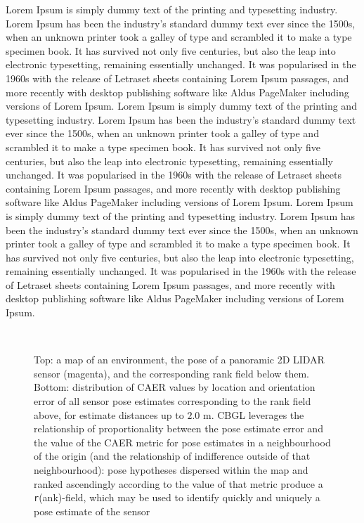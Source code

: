 Lorem Ipsum is simply dummy text of the printing and typesetting industry.
Lorem Ipsum has been the industry's standard dummy text ever since the 1500s,
when an unknown printer took a galley of type and scrambled it to make a type
specimen book. It has survived not only five centuries, but also the leap into
electronic typesetting, remaining essentially unchanged. It was popularised in
the 1960s with the release of Letraset sheets containing Lorem Ipsum passages,
and more recently with desktop publishing software like Aldus PageMaker
including versions of Lorem Ipsum. Lorem Ipsum is simply dummy text of the
printing and typesetting industry.  Lorem Ipsum has been the industry's
standard dummy text ever since the 1500s, when an unknown printer took a galley
of type and scrambled it to make a type specimen book. It has survived not only
five centuries, but also the leap into electronic typesetting, remaining
essentially unchanged. It was popularised in the 1960s with the release of
Letraset sheets containing Lorem Ipsum passages, and more recently with desktop
publishing software like Aldus PageMaker including versions of Lorem Ipsum.
Lorem Ipsum is simply dummy text of the printing and typesetting industry.
Lorem Ipsum has been the industry's standard dummy text ever since the 1500s,
when an unknown printer took a galley of type and scrambled it to make a type
specimen book. It has survived not only five centuries, but also the leap into
electronic typesetting, remaining essentially unchanged. It was popularised in
the 1960s with the release of Letraset sheets containing Lorem Ipsum passages,
and more recently with desktop publishing software like Aldus PageMaker
including versions of Lorem Ipsum.

\begin{figure}
  \subfloat{    \label{fig:a}} \vspace{-1.7cm}\\
  \subfloat{\hspace{-0.3cm} \label{fig:b}}
  \caption{\small
           Top: a map of an environment, the pose of a panoramic 2D LIDAR
           sensor (magenta), and the corresponding rank field below them.
           Bottom: distribution of CAER values by location and orientation
           error of all sensor pose estimates corresponding to the
           rank field above, for estimate distances up to $2.0$ m.
           CBGL leverages the relationship of proportionality between the pose
           estimate error and the value of the CAER metric for pose estimates
           in a neighbourhood of the origin (and the relationship of
           indifference outside of that neighbourhood): pose hypotheses
           dispersed within the map and ranked ascendingly according to the
           value of that metric produce a \texttt{r}(ank)-field, which may be
           used to identify quickly and uniquely a pose estimate of the
           sensor%
           }
  \vspace{-0.75cm}
  \label{fig:AB}
\end{figure}

